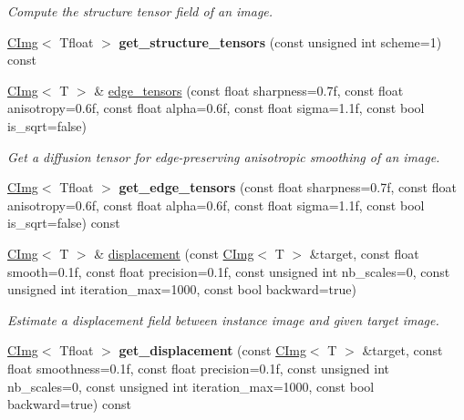 \begin{DoxyCompactItemize}
\begin{DoxyCompactList}\small\item\em Compute the structure tensor field of an image. \item\end{DoxyCompactList}\item 
\hypertarget{structcimg__library_1_1CImg_ad8d68507bd31adc9e98fe63187cca80b}{
\hyperlink{structcimg__library_1_1CImg}{CImg}$<$ Tfloat $>$ {\bfseries get\_\-structure\_\-tensors} (const unsigned int scheme=1) const }
\label{structcimg__library_1_1CImg_ad8d68507bd31adc9e98fe63187cca80b}

\item 
\hypertarget{structcimg__library_1_1CImg_a418fce512edd26218d8db3705a2bb308}{
\hyperlink{structcimg__library_1_1CImg}{CImg}$<$ T $>$ \& \hyperlink{structcimg__library_1_1CImg_a418fce512edd26218d8db3705a2bb308}{edge\_\-tensors} (const float sharpness=0.7f, const float anisotropy=0.6f, const float alpha=0.6f, const float sigma=1.1f, const bool is\_\-sqrt=false)}
\label{structcimg__library_1_1CImg_a418fce512edd26218d8db3705a2bb308}

\begin{DoxyCompactList}\small\item\em Get a diffusion tensor for edge-\/preserving anisotropic smoothing of an image. \item\end{DoxyCompactList}\item 
\hypertarget{structcimg__library_1_1CImg_a50cad194ab0d1e15cb4f6dcb6ee163e1}{
\hyperlink{structcimg__library_1_1CImg}{CImg}$<$ Tfloat $>$ {\bfseries get\_\-edge\_\-tensors} (const float sharpness=0.7f, const float anisotropy=0.6f, const float alpha=0.6f, const float sigma=1.1f, const bool is\_\-sqrt=false) const }
\label{structcimg__library_1_1CImg_a50cad194ab0d1e15cb4f6dcb6ee163e1}

\item 
\hyperlink{structcimg__library_1_1CImg}{CImg}$<$ T $>$ \& \hyperlink{structcimg__library_1_1CImg_a5113cbc5acd82d99c1f86a4299339a6c}{displacement} (const \hyperlink{structcimg__library_1_1CImg}{CImg}$<$ T $>$ \&target, const float smooth=0.1f, const float precision=0.1f, const unsigned int nb\_\-scales=0, const unsigned int iteration\_\-max=1000, const bool backward=true)
\begin{DoxyCompactList}\small\item\em Estimate a displacement field between instance image and given target image. \item\end{DoxyCompactList}\item 
\hypertarget{structcimg__library_1_1CImg_ab1c52b08976eb06c0190a8987c026b02}{
\hyperlink{structcimg__library_1_1CImg}{CImg}$<$ Tfloat $>$ {\bfseries get\_\-displacement} (const \hyperlink{structcimg__library_1_1CImg}{CImg}$<$ T $>$ \&target, const float smoothness=0.1f, const float precision=0.1f, const unsigned int nb\_\-scales=0, const unsigned int iteration\_\-max=1000, const bool backward=true) const }
\label{structcimg__library_1_1CImg_ab1c52b08976eb06c0190a8987c026b02}


\end{DoxyCompactItemize}
